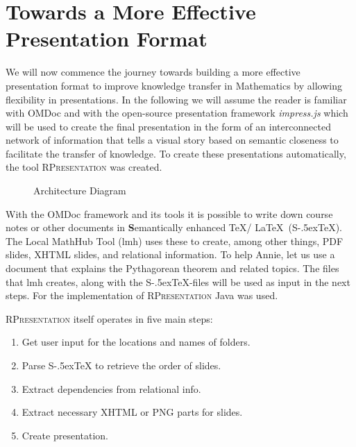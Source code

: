 \documentclass{llncs}
\def\stex{\texorpdfstring{\raisebox{-.5ex}S\kern-.5ex\TeX}{sTeX}\xspace}
\def\sTeX{\stex}
\newcommand{\sys}{\textsc{RPresentation}\xspace}
\begin{document}
\section{Towards a More Effective Presentation Format}
\label{sec:TowardsAMoreEffectivePresentationFormat}

We will now commence the journey towards building a more effective presentation format to improve knowledge transfer in Mathematics by allowing flexibility in presentations. In the following we will assume the reader is familiar with OMDoc \cite{Kohlhase:OMDoc1.2} and with the open-source presentation framework \textit{impress.js} \cite{JSImpress:npentrel14} which will be used to create the final presentation in the form of an interconnected network of information that tells a visual story based on semantic closeness to facilitate the transfer of knowledge. To create these presentations automatically, the tool \sys \cite{npentrel:npentrel15} was created. 

\begin{figure}\centering\vspace{-2em}
  \vspace{-1em}
  \caption{Architecture Diagram}\label{fig:architecture}\vspace{-1em}
\end{figure}

With the OMDoc framework and its tools it is possible to write down course notes or other documents in \textbf{S}emantically enhanced \TeX / \LaTeX\ (\stex). The Local MathHub Tool (lmh) uses these to create, among other things, PDF slides, XHTML slides, and relational information. To help Annie, let us use a document that explains the Pythagorean theorem and related topics. The files that lmh creates, along with the \stex -files will be used as input in the next steps. For the implementation of  \sys Java was used.

\sys itself operates in five main steps:
\begin{enumerate}[topsep=0pt,itemsep=-1ex,partopsep=1ex,parsep=1ex]
\item Get user input for the locations and names of folders.
\item Parse \sTeX to retrieve the order of slides.
\item Extract dependencies from relational info.
\item Extract necessary XHTML or PNG parts for slides.
\item Create presentation.
\end{enumerate}
\vspace{5pt}
\end{document}
